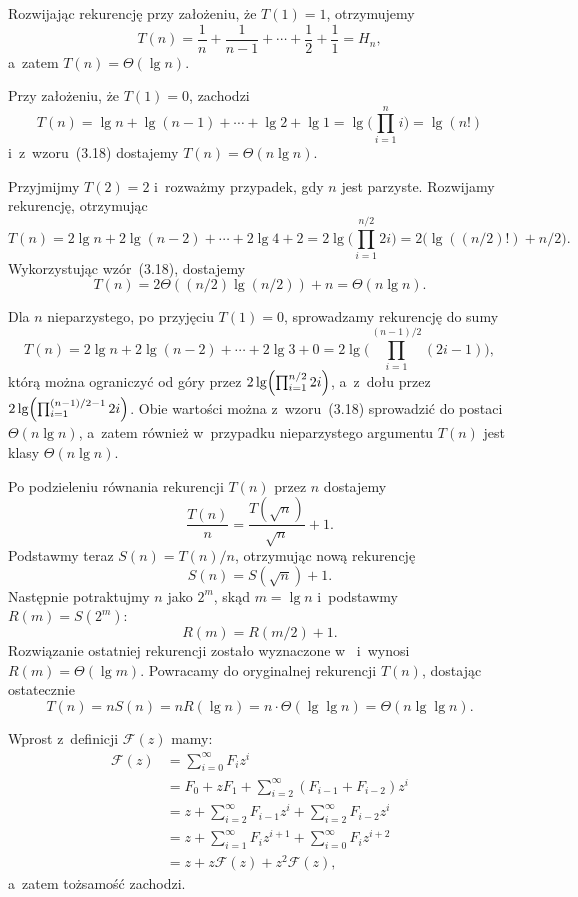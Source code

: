 \subproblem %
Rozwijając rekurencję przy założeniu, że $T(1)=1$, otrzymujemy
\[
	T(n) = \frac{1}{n}+\frac{1}{n-1}+\cdots+\frac{1}{2}+\frac{1}{1} = H_n,
\]
a~zatem $T(n)=\Theta(\lg n)$.

\subproblem %
Przy założeniu, że $T(1)=0$, zachodzi
\[
	T(n) = \lg n+\lg(n-1)+\cdots+\lg2+\lg 1 = \lg\biggl(\prod_{i=1}^ni\biggr) = \lg(n!)
\]
i~z~wzoru~(3.18) dostajemy $T(n)=\Theta(n\lg n)$.

\subproblem %
Przyjmijmy $T(2)=2$ i~rozważmy przypadek, gdy $n$ jest parzyste. Rozwijamy rekurencję, otrzymując
\[
	T(n) = 2\lg n+2\lg(n-2)+\cdots+2\lg4+2 = 2\lg\biggl(\prod_{i=1}^{n/2}2i\biggr) = 2\bigl(\lg((n/2)!)+n/2\bigr).
\]
Wykorzystując wzór~(3.18), dostajemy
\[
	T(n) = 2\Theta((n/2)\lg (n/2))+n = \Theta(n\lg n).
\]

Dla $n$ nieparzystego, po przyjęciu $T(1)=0$, sprowadzamy rekurencję do sumy
\[
	T(n) = 2\lg n+2\lg(n-2)+\cdots+2\lg3+0 = 2\lg\biggl(\prod_{i=1}^{(n-1)/2}(2i-1)\biggr),
\]
którą można ograniczyć od góry przez $2\lg\Bigl(\prod_{i=1}^{n/2}2i\Bigr)$, a~z~dołu przez $2\lg\Bigl(\prod_{i=1}^{(n-1)/2-1}2i\Bigr)$. Obie wartości można z~wzoru~(3.18) sprowadzić do postaci $\Theta(n\lg n)$, a~zatem również w~przypadku nieparzystego argumentu $T(n)$ jest klasy $\Theta(n\lg n)$.

\subproblem %
Po podzieleniu równania rekurencji $T(n)$ przez $n$ dostajemy
\[
	\frac{T(n)}{n} = \frac{T(\!\sqrt{n})}{\sqrt{n}}+1.
\]
Podstawmy teraz $S(n)=T(n)/n$, otrzymując nową rekurencję
\[
	S(n) = S(\!\sqrt{n})+1.
\]
Następnie potraktujmy $n$ jako $2^m$, skąd $m=\lg n$ i~podstawmy $R(m)=S(2^m)$:
\[
	R(m) = R(m/2)+1.
\]
Rozwiązanie ostatniej rekurencji zostało wyznaczone w~ i~wynosi $R(m)=\Theta(\lg m)$. Powracamy do oryginalnej rekurencji $T(n)$, dostając ostatecznie
\[
	T(n) = nS(n) = nR(\lg n) = n\cdot\Theta(\lg\lg n) = \Theta(n\lg\lg n).
\]


\subproblem %
Wprost z~definicji $\mathcal{F}(z)$ mamy:
\begin{align*}
	\mathcal{F}(z) &= \sum_{i=0}^\infty F_iz^i \\
	&= F_0+zF_1+\sum_{i=2}^\infty (F_{i-1}+F_{i-2})z^i \\
	&= z+\sum_{i=2}^\infty F_{i-1}z^i+\sum_{i=2}^\infty F_{i-2}z^i \\
	&= z+\sum_{i=1}^\infty F_iz^{i+1}+\sum_{i=0}^\infty F_iz^{i+2} \\[2mm]
	&= z+z\mathcal{F}(z)+z^2\mathcal{F}(z),
\end{align*}
a~zatem tożsamość zachodzi.

